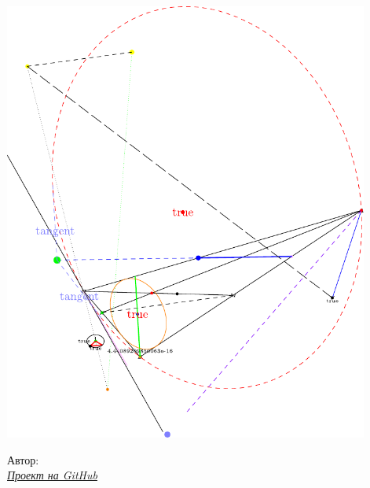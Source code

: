 \begin{titlepage}
	\clearpage\thispagestyle{empty}
	\centering
	
    {\textbf{}}
    \vspace{5mm}
	
	
	\includegraphics[width=0.9\textwidth]{ws}

	\begin{flushright}
		\noindent
		Автор: \href{\VKLink}{\textit{\AuthorInitials}}\\
		\href{\GithubLink}{\textit{Проект на GitHub}}\\
		
	\end{flushright}
	
	\vfill
	\CourseDate
	\pagebreak
\end{titlepage}
